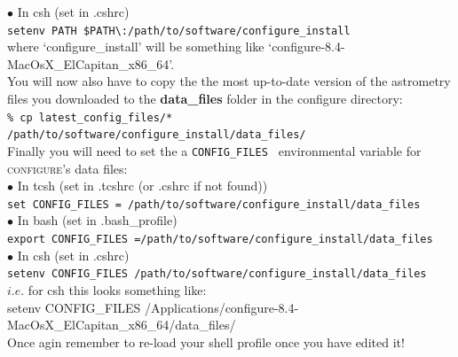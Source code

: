 \documentclass[12pt]{article}
\begin{document}
     $\bullet$ In csh (set in .cshrc)\\
    \hspace{10mm} \texttt{setenv PATH \$PATH\textbackslash:/path/to/software/configure\_install}\\

where `configure\_install' will be something like `configure-8.4-MacOsX\_ElCapitan\_x86\_64'.\\

You will now also have to copy the the most up-to-date version of the astrometry files you downloaded to the \textbf{data\_files} folder in the configure directory:\\

 
\hspace{10mm} \texttt{\% cp  latest\_config\_files/*  /path/to/software/configure\_install/data\_files/}\\


Finally you will need to set the a \texttt{CONFIG\_FILES } environmental variable for \textsc{configure}'s data files:\\

    $\bullet$ In tcsh (set in .tcshrc (or .cshrc if not found)) \\
   \hspace{10mm} \texttt{set CONFIG\_FILES = /path/to/software/configure\_install/data\_files}\\

     $\bullet$ In bash (set in .bash\_profile) \\
    \hspace{10mm} \texttt{export CONFIG\_FILES =/path/to/software/configure\_install/data\_files}\\

     $\bullet$ In csh (set in .cshrc)\\
    \hspace{10mm} \texttt{setenv CONFIG\_FILES /path/to/software/configure\_install/data\_files}\\

$i.e.$ for csh this looks something like:\\ 

\hspace{10mm}  setenv CONFIG\_FILES /Applications/configure-8.4-MacOsX\_ElCapitan\_x86\_64/data\_files/\\


Once agin remember to re-load your shell profile once you have edited it!\\
\end{document}

